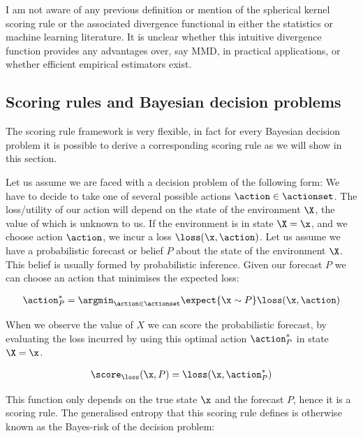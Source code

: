 I am not aware of any previous definition or mention of the spherical kernel scoring rule or the associated divergence functional in either the statistics or machine learning literature. It is unclear whether this intuitive divergence function provides any advantages over, say MMD, in practical applications, or whether efficient empirical estimators exist.


\subsection{Scoring rules and Bayesian decision problems \label{sec:loss_scoring_rule}}

The scoring rule framework is very flexible, in fact for every Bayesian decision problem it is possible to derive a corresponding scoring rule as we will show in this section.

Let us assume we are faced with a decision problem of the following form: We have to decide to take one of several possible actions $\action\in\actionset$. The loss/utility of our action will depend on the state of the environment $\X$, the value of which is unknown to us. If the environment is in state $\X=\x$, and we choose action $\action$, we incur a loss $\loss(\x,\action)$.
Let us assume we have a probabilistic forecast or belief $P$ about the state of the environment $\X$. This belief is usually formed by probabilistic inference. Given our forecast $P$ we can choose an action that minimises the expected loss:

\begin{align}
	\action^{*}_{P} = \argmin_{\action\in\actionset} \expect{\x \sim P} \loss(\x,\action)
\end{align}

When we observe the value of $X$ we can score the probabilistic forecast, by evaluating the loss incurred by using this optimal action $\action^{*}_{P}$ in state $\X=\x$.

\begin{align}
	\score_{\loss}(\x,P) = \loss(\x,\action^{*}_{P}) \label{eqn:loss_scoring_rule}
\end{align}

This function only depends on the true state $\x$ and the forecast $P$, hence it is a scoring rule. The generalised entropy that this scoring rule defines is otherwise known as the Bayes-risk of the decision problem:

